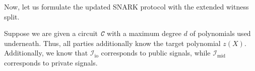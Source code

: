 \documentclass[../lecture-notes-148x210.tex]{subfiles}
\begin{document}
Now, let us formulate the updated SNARK protocol with the extended witness split.

\begin{tcolorbox}[title=Attempt \#4: Sound SNARK for Public/Private Inputs,
    breakable,
    colback=blue!5!white,
    colframe=blue!75!black,
    colbacktitle=blue!25!white,
    coltitle=blue!20!black,
    fonttitle=\bfseries,
    boxrule=1.25pt,
    subtitle style={boxrule=0pt,
    colback=blue!20!white,
    colupper=blue!75!gray} ]

    Suppose we are given a circuit $\textit{\texttt{C}}$ with a maximum degree $d$ of polynomials used underneath. Thus, all parties additionally know the target polynomial $z(X)$. \textcolor{green!50!black}{Additionally, we know that $\mathcal{I}_{\text{io}}$ corresponds to public signals, while $\mathcal{I}_{\text{mid}}$ corresponds to private signals.}


\end{tcolorbox}
\end{document}
